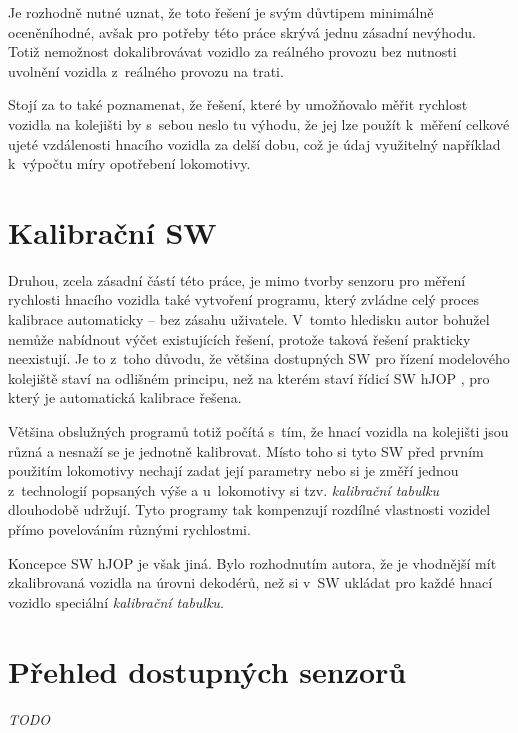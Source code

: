 Je rozhodně nutné uznat, že toto řešení je svým důvtipem minimálně oceněníhodné,
avšak pro potřeby této práce skrývá jednu zásadní nevýhodu. Totiž nemožnost
dokalibrovávat vozidlo za reálného provozu bez nutnosti uvolnění vozidla
z~reálného provozu na trati.

Stojí za to také poznamenat, že řešení, které by umožňovalo měřit rychlost
vozidla na kolejišti by s~sebou neslo tu výhodu, že jej lze použít k~měření
celkové ujeté vzdálenosti hnacího vozidla za delší dobu, což je údaj využitelný
například k~výpočtu míry opotřebení lokomotivy.

\section{Kalibrační SW}

Druhou, zcela zásadní částí této práce, je mimo tvorby senzoru pro měření
rychlosti hnacího vozidla také vytvoření programu, který zvládne celý proces
kalibrace automaticky -- bez zásahu uživatele. V~tomto hledisku autor bohužel
nemůže nabídnout výčet existujících řešení, protože taková řešení
prakticky neexistují. Je to z~toho důvodu, že většina dostupných SW pro řízení
modelového kolejiště staví na odlišném principu, než na kterém staví řídicí SW
hJOP \cite{hjop:web}, pro který je automatická kalibrace řešena.

Většina obslužných programů totiž počítá s~tím, že hnací vozidla na kolejišti
jsou různá a nesnaží se je jednotně kalibrovat. Místo toho si tyto SW před
prvním použitím lokomotivy nechají zadat její parametry nebo si je změří jednou
z~technologií popsaných výše a u~lokomotivy si tzv. \textit{kalibrační tabulku}
dlouhodobě udržují. Tyto programy tak kompenzují rozdílné vlastnosti vozidel přímo
povelováním různými rychlostmi.

Koncepce SW hJOP je však jiná. Bylo rozhodnutím autora, že je vhodnější mít
zkalibrovaná vozidla na úrovni dekodérů, než si v~SW ukládat pro každé hnací
vozidlo speciální \textit{kalibrační tabulku}.

\section{Přehled dostupných senzorů}

\textit{TODO}
